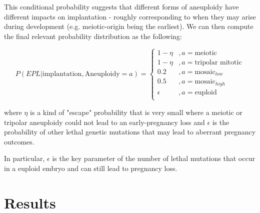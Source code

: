 \documentclass{article}
\begin{document}
This conditional probability suggests that different forms of aneuploidy have different impacts on implantation - roughly corresponding to when they may arise during development (e.g. meiotic-origin being the earliest). We can then compute the final relevant probability distribution as the following: 

$$
P(EPL | \text{implantation}, \text{Aneuploidy}=a) = \begin{cases}
1 - \eta &, a = \text{meiotic}\\
1 - \eta &, a = \text{tripolar mitotic}\\
0.2 &, a = \text{mosaic}_{low}\\
0.5 &, a = \text{mosaic}_{high}\\
\epsilon &, a = \text{euploid}\\
\end{cases}
$$

where $\eta$ is a kind of "escape" probability that is very small where a meiotic or tripolar aneuploidy could not lead to an early-pregnancy loss and $\epsilon$ is the probability of other lethal genetic mutations that may lead to aberrant pregnancy outcomes. 

In particular,  $\epsilon$ is the key parameter of the number of lethal mutations that occur in a euploid embryo and can still lead to pregnancy loss. 



\section*{Results}







\end{document}
